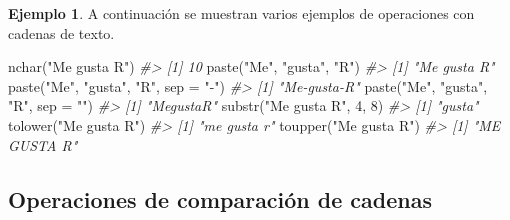\documentclass[
]{book}
\newenvironment{Shaded}{\begin{snugshade}}{\end{snugshade}}
\newcommand{\AttributeTok}[1]{\textcolor[rgb]{0.77,0.63,0.00}{#1}}
\newcommand{\CommentTok}[1]{\textcolor[rgb]{0.56,0.35,0.01}{\textit{#1}}}
\newcommand{\DecValTok}[1]{\textcolor[rgb]{0.00,0.00,0.81}{#1}}
\newcommand{\FunctionTok}[1]{\textcolor[rgb]{0.00,0.00,0.00}{#1}}
\newcommand{\NormalTok}[1]{#1}
\newcommand{\StringTok}[1]{\textcolor[rgb]{0.31,0.60,0.02}{#1}}
\theoremstyle{definition}
\theoremstyle{definition}
\newtheorem{example}{Ejemplo}[chapter]
\theoremstyle{definition}
\theoremstyle{definition}
\theoremstyle{remark}
\begin{document}
\begin{example}

A continuación se muestran varios ejemplos de operaciones con cadenas de texto.

\begin{Shaded}
\begin{Highlighting}[]
\FunctionTok{nchar}\NormalTok{(}\StringTok{"Me gusta R"}\NormalTok{)}
\CommentTok{\#\textgreater{} [1] 10}
\FunctionTok{paste}\NormalTok{(}\StringTok{"Me"}\NormalTok{, }\StringTok{"gusta"}\NormalTok{, }\StringTok{"R"}\NormalTok{)}
\CommentTok{\#\textgreater{} [1] "Me gusta R"}
\FunctionTok{paste}\NormalTok{(}\StringTok{"Me"}\NormalTok{, }\StringTok{"gusta"}\NormalTok{, }\StringTok{"R"}\NormalTok{, }\AttributeTok{sep =} \StringTok{"{-}"}\NormalTok{)}
\CommentTok{\#\textgreater{} [1] "Me{-}gusta{-}R"}
\FunctionTok{paste}\NormalTok{(}\StringTok{"Me"}\NormalTok{, }\StringTok{"gusta"}\NormalTok{, }\StringTok{"R"}\NormalTok{, }\AttributeTok{sep =} \StringTok{""}\NormalTok{)}
\CommentTok{\#\textgreater{} [1] "MegustaR"}
\FunctionTok{substr}\NormalTok{(}\StringTok{"Me gusta R"}\NormalTok{, }\DecValTok{4}\NormalTok{, }\DecValTok{8}\NormalTok{)}
\CommentTok{\#\textgreater{} [1] "gusta"}
\FunctionTok{tolower}\NormalTok{(}\StringTok{"Me gusta R"}\NormalTok{)}
\CommentTok{\#\textgreater{} [1] "me gusta r"}
\FunctionTok{toupper}\NormalTok{(}\StringTok{"Me gusta R"}\NormalTok{)}
\CommentTok{\#\textgreater{} [1] "ME GUSTA R"}
\end{Highlighting}
\end{Shaded}

\end{example}

\hypertarget{operaciones-de-comparaciuxf3n-de-cadenas}{%
\subsection{Operaciones de comparación de cadenas}\label{operaciones-de-comparaciuxf3n-de-cadenas}}
\end{document}
